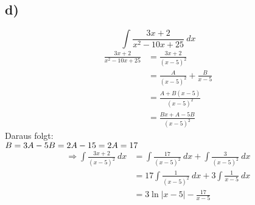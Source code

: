 \documentclass[a4paper]{scrartcl}
\begin{document}
\subsection{d)}
\[\int\frac{3x+2}{x^2-10x+25}\ dx\]
\begin{align}
\frac{3x+2}{x^2-10x+25}&=\frac{3x+2}{(x-5)^2}\\
	&=\frac{A}{(x-5)^2}+\frac{B}{x-5}\\
	&=\frac{A+B(x-5)}{(x-5)^2}\\
	&=\frac{Bx+A-5B}{(x-5)^2}
\end{align}
Daraus folgt:\\
\(B=3\\
A-5B=2\\
A-15=2\\
A=17\)
\begin{align}
\Rightarrow\int\frac{3x+2}{(x-5)^2}\ dx&=\int\frac{17}{(x-5)^2}\ dx+\int\frac{3}{(x-5)^2}\ dx\\
	&=17\int\frac{1}{(x-5)^2}\ dx+3\int\frac{1}{x-5}\ dx\\
	&=3\ln |x-5|-\frac{17}{x-5}
\end{align}
\end{document}
